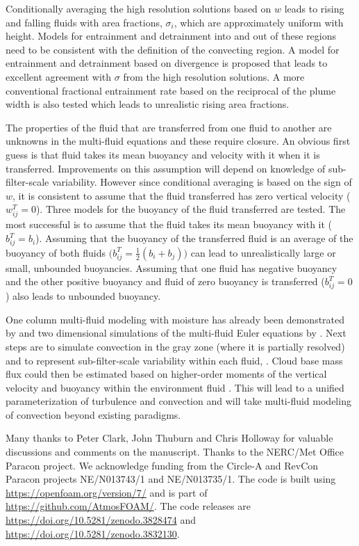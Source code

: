 \documentclass[draft]{agujournal2019}
\begin{document}
Conditionally averaging the high resolution solutions based on $w$
leads to
rising and falling fluids with area fractions, $\sigma_{i}$, which are approximately uniform with height. Models for entrainment and detrainment into and out of these regions
need to be consistent with the definition of the convecting region.
A model for entrainment and detrainment based on divergence is proposed
that leads to excellent agreement with $\sigma$ from the high resolution
solutions. A more conventional fractional entrainment rate based on the reciprocal of the plume width is also tested which leads to unrealistic rising area fractions. 

The properties of the fluid that are transferred from one fluid to another are unknowns in the multi-fluid equations and these require closure. An obvious
first guess is that fluid takes its mean buoyancy and velocity
with it when it is transferred.
Improvements on this assumption will depend on knowledge of sub-filter-scale variability. However since conditional averaging is based on the sign of $w$, it is consistent to assume that the fluid transferred has zero vertical velocity ($w_{ij}^T=0$).
Three models for the buoyancy of the fluid transferred 
are tested. The most successful
is to assume that the fluid takes its mean buoyancy with it
($b_{ij}^T=b_i$).
Assuming that the buoyancy of the transferred fluid is an average of the buoyancy of both fluids $\bigl(b_{ij}^T=\frac{1}{2}(b_i+b_j)\bigr)$ can lead to unrealistically large or small, unbounded buoyancies. 
Assuming that one fluid has negative buoyancy and the other positive buoyancy and fluid of zero buoyancy is transferred ($b_{ij}^T=0$) also leads to unbounded buoyancy. 

One column multi-fluid modeling with moisture has already been demonstrated by  and two dimensional simulations of the multi-fluid Euler equations by \protect{}.
Next steps are to simulate convection in the gray zone (where it is partially resolved) and to represent sub-filter-scale variability within each fluid, .
Cloud base mass flux could then be estimated based on higher-order moments of the vertical velocity and buoyancy within the environment fluid .
This will lead to a unified parameterization of turbulence and convection and will take multi-fluid modeling of convection beyond existing paradigms. 

\acknowledgments

Many thanks to Peter Clark, John Thuburn and Chris Holloway for valuable discussions and comments on the manuscript.
Thanks to the NERC/Met Office Paracon project. We acknowledge funding
from the Circle-A and RevCon Paracon projects NE/N013743/1 and NE/N013735/1. The code is built using \url{https://openfoam.org/version/7/} and is part of \url{https://github.com/AtmosFOAM/}. The code releases are \url{https://doi.org/10.5281/zenodo.3828474} and \url{https://doi.org/10.5281/zenodo.3832130}.


\end{document}
